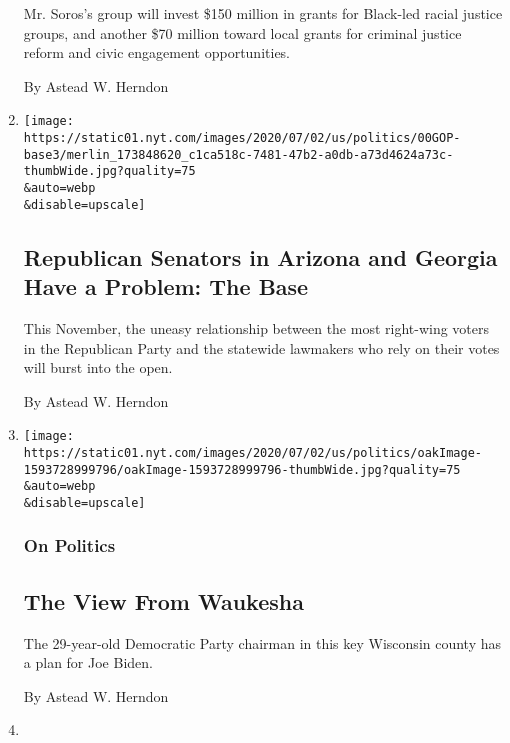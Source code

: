 \begin{enumerate}
  Mr. Soros's group will invest \$150 million in grants for Black-led
  racial justice groups, and another \$70 million toward local grants
  for criminal justice reform and civic engagement opportunities.

  By Astead W. Herndon
\item
  \href{/2020/07/09/us/politics/kelly-loeffler-georgia-senate-arizona.html}{}

  \texttt{[image: https://static01.nyt.com/images/2020/07/02/us/politics/00GOP-base3/merlin\_173848620\_c1ca518c-7481-47b2-a0db-a73d4624a73c-thumbWide.jpg?quality=75\\\&auto=webp\\\&disable=upscale]}

  \hypertarget{republican-senators-in-arizona-and-georgia-have-a-problem-the-base}{%
  \subsection{Republican Senators in Arizona and Georgia Have a Problem:
  The
  Base}\label{republican-senators-in-arizona-and-georgia-have-a-problem-the-base}}

  This November, the uneasy relationship between the most right-wing
  voters in the Republican Party and the statewide lawmakers who rely on
  their votes will burst into the open.

  By Astead W. Herndon
\item
  \href{/2020/07/02/us/politics/waukesha-wisconsin-biden-trump.html}{}

  \texttt{[image: https://static01.nyt.com/images/2020/07/02/us/politics/oakImage-1593728999796/oakImage-1593728999796-thumbWide.jpg?quality=75\\\&auto=webp\\\&disable=upscale]}

  \hypertarget{on-politics}{%
  \subsubsection{On Politics}\label{on-politics}}

  \hypertarget{the-view-from-waukesha}{%
  \subsection{The View From Waukesha}\label{the-view-from-waukesha}}

  The 29-year-old Democratic Party chairman in this key Wisconsin county
  has a plan for Joe Biden.

  By Astead W. Herndon
\item
  \href{/2020/06/27/us/politics/trump-biden-protests-polling.html}{}


\end{enumerate}
